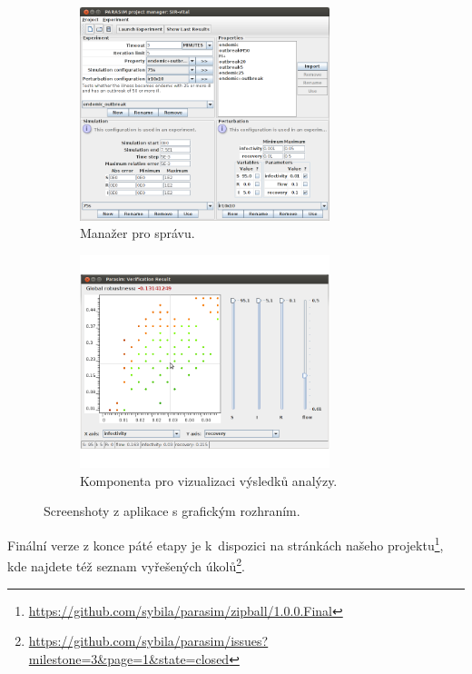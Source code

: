 \documentclass{parasim}
\begin{document}
\begin{figure}[h!]
	\centering
	\begin{subfigure}[b]{0.48\textwidth}
		\centering
		\includegraphics[width=0.8\textwidth]{1.0.0.Final/project-manager.png}
		\caption{Manažer pro správu.}
	\end{subfigure}
	\begin{subfigure}[b]{0.48\textwidth}
		\centering		
		\includegraphics[width=0.8\textwidth]{1.0.0.Final/plotter.png}
		\caption{Komponenta pro vizualizaci výsledků analýzy.}
	\end{subfigure}
	\caption{Screenshoty z aplikace s grafickým rozhraním.}
\end{figure}

Finální verze z konce páté etapy je k~dispozici na stránkách našeho projektu\footnote{\url{https://github.com/sybila/parasim/zipball/1.0.0.Final}},
kde najdete též seznam vyřešených úkolů\footnote{\url{https://github.com/sybila/parasim/issues?milestone=3&page=1&state=closed}}.
\end{document}
